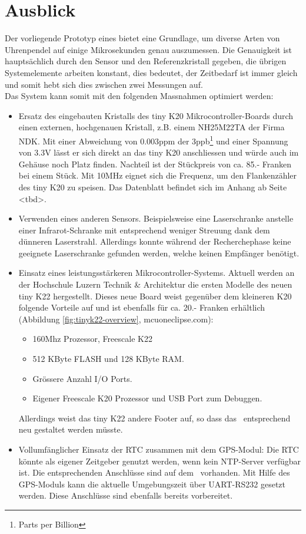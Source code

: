 \section{Ausblick}
Der vorliegende Prototyp eines \documenttitle bietet eine Grundlage, um diverse Arten von Uhrenpendel auf einige Mikrosekunden genau auszumessen. Die Genauigkeit ist hauptsächlich durch den Sensor und den Referenzkristall gegeben, die übrigen Systemelemente arbeiten konstant, dies bedeutet, der Zeitbedarf ist immer gleich und somit hebt sich dies zwischen zwei Messungen auf.\\
Das System kann somit mit den folgenden Massnahmen optimiert werden:
\begin{itemize}
	\item Ersatz des eingebauten Kristalls des tiny K20 Mikrocontroller-Boards durch einen externen, hochgenauen Kristall, z.B. einem NH25M22TA der Firma NDK. Mit einer Abweichung von 0.003ppm der 3ppb\footnote{Parts per Billion} und einer Spannung von 3.3V lässt er sich direkt an das tiny K20 anschliessen und würde auch im Gehäuse noch Platz finden. Nachteil ist der Stückpreis von ca. 85.- Franken bei einem Stück. Mit 10MHz eignet sich die Frequenz, um den Flankenzähler des tiny K20 zu speisen. Das Datenblatt befindet sich im Anhang ab Seite <tbd>.
	\item Verwenden eines anderen Sensors. Beispielsweise eine Laserschranke anstelle einer Infrarot-Schranke mit entsprechend weniger Streuung dank dem dünneren Laserstrahl. Allerdings konnte während der Recherchephase keine geeignete Laserschranke gefunden werden, welche keinen Empfänger benötigt.
	\item Einsatz eines leistungsstärkeren Mikrocontroller-Systems. Aktuell werden an der Hochschule Luzern Technik \& Architektur die ersten Modelle des neuen tiny K22 hergestellt. Dieses neue Board weist gegenüber dem kleineren K20 folgende Vorteile auf und ist ebenfalls für ca. 20.- Franken erhältlich (Abbildung \ref{fig:tinyk22-overview}, mcuoneclipse.com):
	\begin{itemize}
		\item 160Mhz Prozessor, Freescale K22
		\item 512 KByte FLASH und 128 KByte RAM.
		\item Grössere Anzahl I/O Ports.
		\item Eigener Freescale K20 Prozessor und USB Port zum Debuggen. 
	\end{itemize}
	Allerdings weist das tiny K22 andere Footer auf, so dass das \hwb\ entsprechend neu gestaltet werden müsste.
	\item Vollumfänglicher Einsatz der RTC zusammen mit dem GPS-Modul: Die RTC könnte als eigener Zeitgeber genutzt werden, wenn kein NTP-Server verfügbar ist. Die entsprechenden \iic Anschlüsse sind auf dem \hwb\ vorhanden. Mit Hilfe des GPS-Moduls kann die aktuelle Umgebungszeit über UART-RS232 gesetzt werden. Diese Anschlüsse sind ebenfalls bereits vorbereitet.  
\end{itemize}
